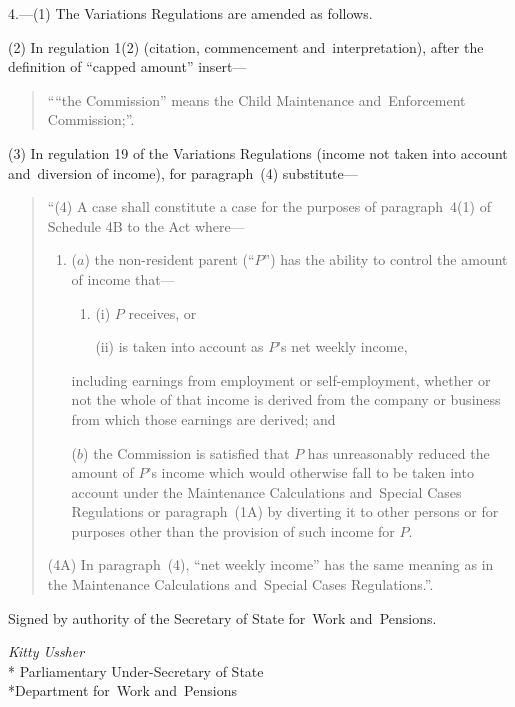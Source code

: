 \documentclass[12pt,a4paper]{article}
\begin{document}
4.---(1)  The Variations Regulations are amended as follows.

(2) In regulation 1(2) (citation, commencement and~interpretation), after the definition of “capped amount” insert—
\begin{quotation}
““the Commission” means the Child Maintenance and~Enforcement Commission;”.
\end{quotation}

(3) In regulation 19 of the Variations Regulations (income not taken into account and~diversion of income), for paragraph~(4) substitute—
\begin{quotation}
“(4) A case shall constitute a case for the purposes of paragraph~4(1) of Schedule 4B to the Act where—
\begin{enumerate}\item[]
($a$) the non-resident parent (“$P$”) has the ability to control the amount of income that—
\begin{enumerate}\item[]
(i) $P$ receives, or

(ii) is taken into account as $P$’s net weekly income,
\end{enumerate}
including earnings from employment or self-employment, whether or not the whole of that income is derived from the company or business from which those earnings are derived; and

($b$) the Commission is satisfied that $P$ has unreasonably reduced the amount of $P$’s income which would otherwise fall to be taken into account under the Maintenance Calculations and~Special Cases Regulations or paragraph~(1A) by diverting it to other persons or for purposes other than the provision of such income for $P$.
\end{enumerate}

(4A) In paragraph~(4), “net weekly income” has the same meaning as in the Maintenance Calculations and~Special Cases Regulations.”.
\end{quotation}

\bigskip

\pagebreak[3]

Signed 
by authority of the 
Secretary of State for~Work and~Pensions.

{\raggedleft
\emph{Kitty Ussher}\\*
Parliamentary Under-Secretary 
of State\\*Department 
for~Work and~Pensions

}
\end{document}
